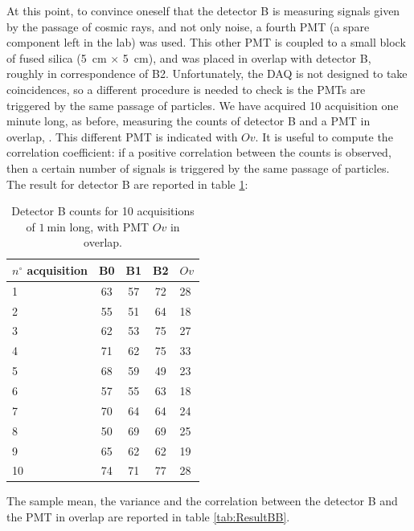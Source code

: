 At this point, to convince oneself that the detector B is measuring signals given by the passage of cosmic rays, and not only noise, a fourth PMT (a spare component left in the lab) was used. This other PMT is coupled to a small block of fused silica (\SI{5}{\centi \meter} $\times$ \SI{5}{\centi \meter}), and was placed in overlap with detector B, roughly in correspondence of B2.
Unfortunately, the DAQ is not designed to take coincidences, so a different procedure is needed to check is the PMTs are triggered by the same passage of particles. We have acquired 10 acquisition one minute long, as before, measuring the counts of detector B and a PMT in overlap, . This different PMT is indicated with $Ov$. 
It is useful to compute the correlation coefficient: if a positive correlation between the counts is observed, then a certain number of signals is triggered by the same passage of particles. The result for detector B are reported in table \ref{tab:OverlapB}:

\begin{table}[ht]
\centering
\begin{tabular}{lcccl}
\hline 
$n^{\circ}$ acquisition  & B0 & B1 & B2 & $Ov$ \\ 
\hline 
1 & 63 & 57 & 72 & 28 \\ 
 
2 & 55 & 51 & 64 & 18 \\ 
 
3 & 62 & 53 & 75 & 27 \\ 
 
4 & 71 & 62 & 75 & 33 \\ 
 
5 & 68 & 59 & 49 & 23 \\ 
 
6 & 57 & 55 & 63 & 18 \\ 
 
7 & 70 & 64 & 64 & 24 \\ 
 
8 & 50 & 69 & 69 & 25 \\ 
 
9 & 65 & 62 & 62 & 19 \\ 
 
10 & 74 & 71 & 77 & 28 \\ 
\hline
\end{tabular} 
\caption{Detector B counts for 10 acquisitions of $\SI{1}{\minute}$ long, with PMT $Ov$ in overlap.}
\label{tab:OverlapB}
\end{table} 

The sample mean, the variance and the correlation between the detector B and the PMT in overlap are reported in table \ref{tab:ResultBB}.

